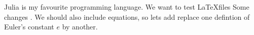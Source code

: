 Julia is  my favourite programming language.
We want to test \LaTeX files 
Some changes .
We should also include equations, so lets add replace one defintion of Euler's constant $e$ by another.
